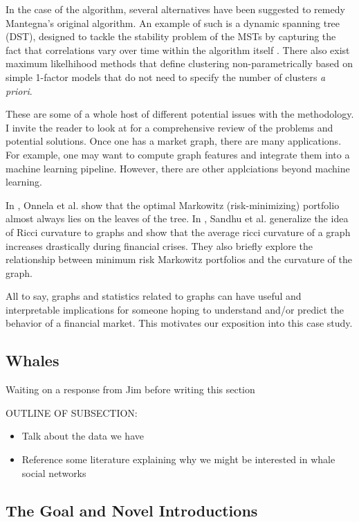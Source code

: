 \documentclass{article}
\theoremstyle{definition}
\begin{document}
In the case of the algorithm, several alternatives have been suggested to remedy Mantegna's original algorithm. An example of such is a dynamic spanning tree (DST), designed to tackle the stability problem of the MSTs by capturing the fact that correlations vary over time within the algorithm itself \cite{dynamicSpanningTrees}. There also exist maximum likelhihood methods \cite{mleClustering} that define clustering non-parametrically based on simple 1-factor models that do not need to specify the number of clusters \textit{a priori}.

These are some of a whole host of different potential issues with the methodology. I invite the reader to look at \cite{networkSurveyFinance} for a comprehensive review of the problems and potential solutions. Once one has a market graph, there are many applications. For example, one may want to compute graph features and integrate them into a machine learning pipeline. However, there are other applciations beyond machine learning.

In \cite{dynamicsMarketCorrelations}, Onnela et al. show that the optimal Markowitz (risk-minimizing) portfolio almost always lies on the leaves of the tree. In \cite{sandhu2015market}, Sandhu et al. generalize the idea of Ricci curvature to graphs and show that the average ricci curvature of a graph increases drastically during financial crises. They also briefly explore the relationship between minimum risk Markowitz portfolios and the curvature of the graph.

All to say, graphs and statistics related to graphs can have useful and interpretable implications for someone hoping to understand and/or predict the behavior of a financial market. This motivates our exposition into this case study.

\subsection{Whales}

Waiting on a response from Jim before writing this section

OUTLINE OF SUBSECTION:

\begin{itemize}
    \item Talk about the data we have
    \item Reference some literature explaining why we might be interested in whale social networks
\end{itemize}

\subsection{The Goal and Novel Introductions}
\label{sec:projectGoal}
\end{document}

